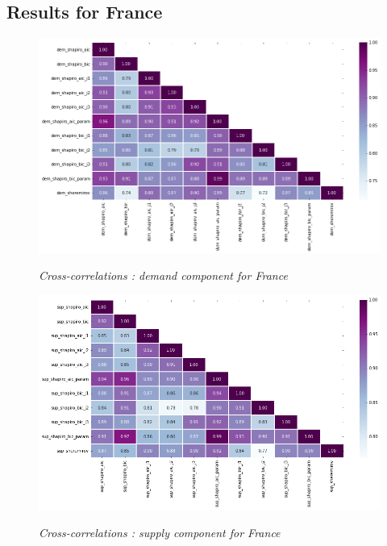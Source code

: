 \subsection{Results for France}

\begin{figure}[h!]
    \centering
    \caption{\textit{Cross-correlations : demand component for France}}
    \includegraphics[width=1\textwidth]{img/dem_heat.png}
    \label{figure:dem_heat}
\end{figure}

\newpage

\begin{figure}[h!]
    \centering
    \caption{\textit{Cross-correlations : supply component for France}}
    \includegraphics[width=1\textwidth]{img/sup_heat.png}
    \label{figure:sup_heat}
\end{figure}
